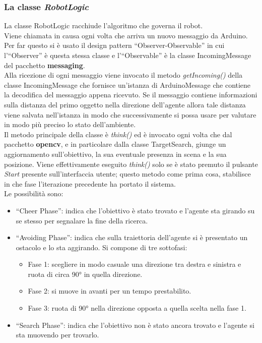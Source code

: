 \subsubsection{La classe \emph{RobotLogic}}
La classe RobotLogic racchiude l'algoritmo che governa il robot.\\
Viene chiamata in causa ogni volta che arriva un nuovo messaggio da Arduino. 
Per far questo si è usato il design pattern ``Observer-Observable'' 
in cui l'``Observer'' è questa stessa classe e l'``Observable''
è la classe IncomingMessage del pacchetto \textbf{messaging}.\\
Alla ricezione di ogni messaggio viene invocato il metodo \emph{getIncoming()} 
della classe IncomingMessage che fornisce un'istanza di ArduinoMessage che contiene 
la decodifica del messaggio appena ricevuto. Se il messaggio
contiene informazioni sulla distanza del primo oggetto nella direzione dell'agente
allora tale distanza viene salvata nell'istanza in modo che successivamente si
possa usare per valutare in modo più preciso lo stato dell'ambiente.\\
Il metodo principale della classe è \emph{think()} ed è invocato ogni volta che
dal pacchetto \textbf{opencv}, e in particolare dalla classe TargetSearch, giunge un aggiornamento
sull'obiettivo, la sua eventuale presenza in scena e la sua posizione. Viene 
effettivamente eseguito \emph{think()} solo se è stato premuto il pulsante \emph{Start}
presente sull'interfaccia utente; questo metodo come prima cosa, stabilisce in che fase l'iterazione precedente ha portato il sistema. \\
Le possibilità sono:
\begin{itemize}
	\item ``Cheer Phase'': indica che l'obiettivo è stato trovato e l'agente sta
	girando su se stesso per segnalare la fine della ricerca.
	\item ``Avoiding Phase'': indica che sulla traiettoria dell'agente si è presentato un ostacolo e lo sta aggirando. Si compone di tre sottofasi:
	\begin{itemize}
		\item Fase 1: scegliere in modo casuale una direzione tra destra e sinistra e ruota di circa 90° in quella direzione. 
		\item Fase 2: si muove in avanti per un tempo prestabilito.
		\item Fase 3: ruota di 90° nella direzione opposta a quella scelta nella fase 1.
	\end{itemize}
	\item ``Search Phase'': indica che l'obiettivo non è stato ancora trovato e l'agente si sta muovendo per trovarlo.
	\end{itemize}
